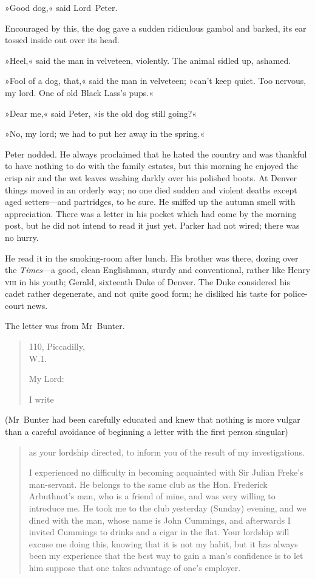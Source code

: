 »Good dog,« said Lord~Peter.

Encouraged by this, the dog gave a sudden ridiculous gambol and barked, its ear tossed inside out over its head.

»Heel,« said the man in velveteen, violently. The animal sidled up, ashamed.

»Fool of a dog, that,« said the man in velveteen; »can't keep quiet. Too nervous, my lord. One of old Black Lass's pups.«

»Dear me,« said Peter, »is the old dog still going?«

»No, my lord; we had to put her away in the spring.«

Peter nodded. He always proclaimed that he hated the country and was thankful to have nothing to do with the family estates, but this morning he enjoyed the crisp air and the wet leaves washing darkly over his polished boots. At Denver things moved in an orderly way; no one died sudden and violent deaths except aged setters—and partridges, to be sure. He sniffed up the autumn smell with appreciation. There was a letter in his pocket which had come by the morning post, but he did not intend to read it just yet. Parker had not wired; there was no hurry.

He read it in the smoking-room after lunch. His brother was there, dozing over the \textit{Times}---a good, clean Englishman, sturdy and conventional, rather like Henry \textsc{viii} in his youth; Gerald, sixteenth Duke of Denver. The Duke considered his cadet rather degenerate, and not quite good form; he disliked his taste for police-court news.

The letter was from Mr~Bunter.

\clearpage


\begin{quotation}
\begin{flushright}
110, Piccadilly,\\
W.1.
\end{flushright}

\noindent My Lord:

I write 
\end{quotation}

(Mr~Bunter had been carefully educated and knew that nothing is more vulgar than a careful avoidance of beginning a letter with the first person singular) 

\begin{quotation}
as your lordship directed, to inform you of the result of my investigations.

I experienced no difficulty in becoming acquainted with Sir Julian Freke's man-servant. He belongs to the same club as the Hon. Frederick Arbuthnot's man, who is a friend of mine, and was very willing to introduce me. He took me to the club yesterday (Sunday) evening, and we dined with the man, whose name is John Cummings, and afterwards I invited Cummings to drinks and a cigar in the flat. Your lordship will excuse me doing this, knowing that it is not my habit, but it has always been my experience that the best way to gain a man's confidence is to let him suppose that one takes advantage of one's employer.
\end{quotation}

